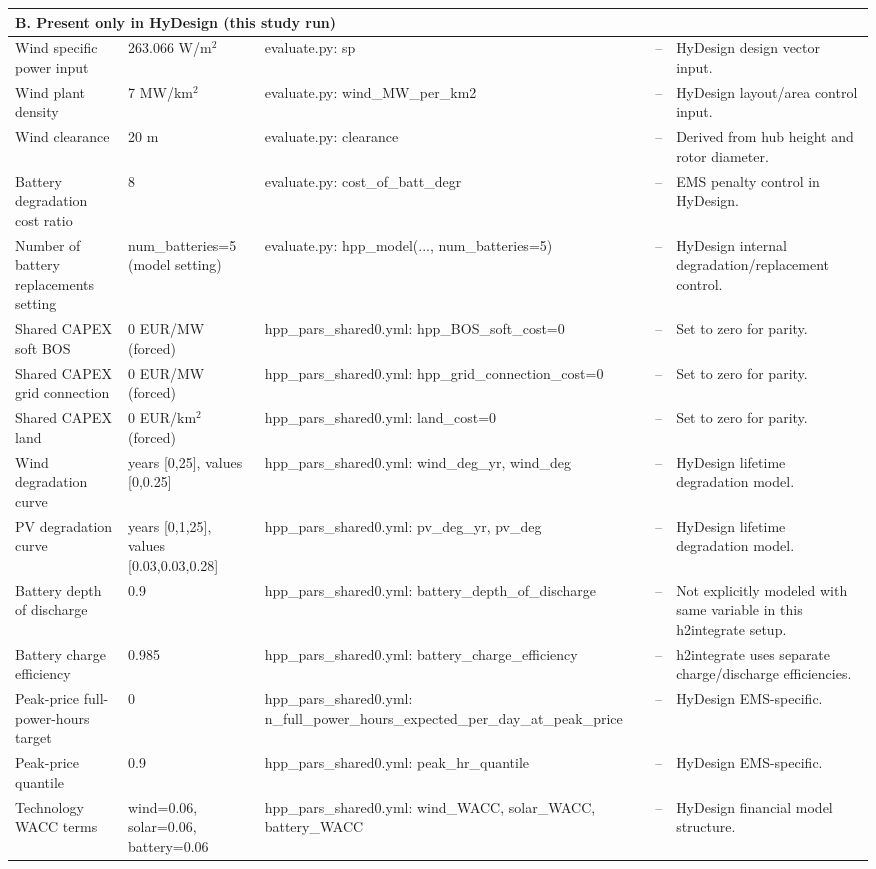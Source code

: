 \begin{center}
\begin{longtable}{p{} p{} p{} p{} p{}}
\midrule
\multicolumn{5}{l}{\textbf{B. Present only in HyDesign (this study run)}} \\
\midrule
Wind specific power input & 263.066 W/m$^2$ & evaluate.py: sp & -- & HyDesign design vector input. \\
Wind plant density & 7 MW/km$^2$ & evaluate.py: wind\_MW\_per\_km2 & -- & HyDesign layout/area control input. \\
Wind clearance & 20 m & evaluate.py: clearance & -- & Derived from hub height and rotor diameter. \\
Battery degradation cost ratio & 8 & evaluate.py: cost\_of\_batt\_degr & -- & EMS penalty control in HyDesign. \\
Number of battery replacements setting & num\_batteries=5 (model setting) & evaluate.py: hpp\_model(..., num\_batteries=5) & -- & HyDesign internal degradation/replacement control. \\
Shared CAPEX soft BOS & 0 EUR/MW (forced) & hpp\_pars\_shared0.yml: hpp\_BOS\_soft\_cost=0 & -- & Set to zero for parity. \\
Shared CAPEX grid connection & 0 EUR/MW (forced) & hpp\_pars\_shared0.yml: hpp\_grid\_connection\_cost=0 & -- & Set to zero for parity. \\
Shared CAPEX land & 0 EUR/km$^2$ (forced) & hpp\_pars\_shared0.yml: land\_cost=0 & -- & Set to zero for parity. \\
Wind degradation curve & years [0,25], values [0,0.25] & hpp\_pars\_shared0.yml: wind\_deg\_yr, wind\_deg & -- & HyDesign lifetime degradation model. \\
PV degradation curve & years [0,1,25], values [0.03,0.03,0.28] & hpp\_pars\_shared0.yml: pv\_deg\_yr, pv\_deg & -- & HyDesign lifetime degradation model. \\
Battery depth of discharge & 0.9 & hpp\_pars\_shared0.yml: battery\_depth\_of\_discharge & -- & Not explicitly modeled with same variable in this h2integrate setup. \\
Battery charge efficiency & 0.985 & hpp\_pars\_shared0.yml: battery\_charge\_efficiency & -- & h2integrate uses separate charge/discharge efficiencies. \\
Peak-price full-power-hours target & 0 & hpp\_pars\_shared0.yml: n\_full\_power\_hours\_expected\_per\_day\_at\_peak\_price & -- & HyDesign EMS-specific. \\
Peak-price quantile & 0.9 & hpp\_pars\_shared0.yml: peak\_hr\_quantile & -- & HyDesign EMS-specific. \\
Technology WACC terms & wind=0.06, solar=0.06, battery=0.06 & hpp\_pars\_shared0.yml: wind\_WACC, solar\_WACC, battery\_WACC & -- & HyDesign financial model structure. \\

\end{longtable}
\end{center}
